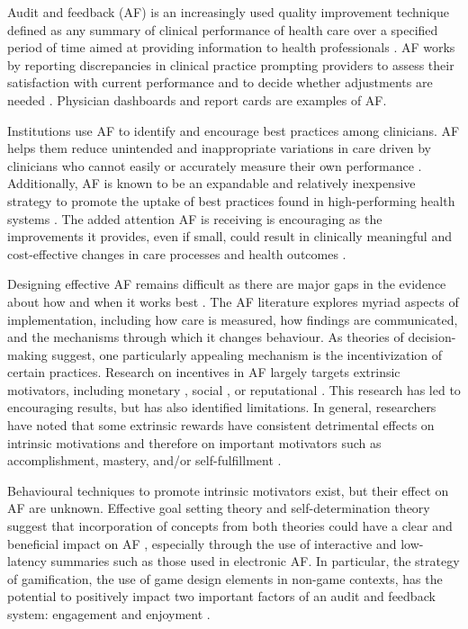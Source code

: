 Audit and feedback (\gls{AF}) is an increasingly used quality improvement technique defined as any summary of clinical performance of health care over a specified period of time aimed at providing information to health professionals \cite{flottorp2010using}. \gls{AF} works by reporting discrepancies in clinical practice prompting providers to assess their satisfaction with current performance and to decide whether adjustments are needed \cite{gould2014application}. Physician dashboards and report cards are examples of \gls{AF}.

Institutions use \gls{AF} to identify and encourage best practices among clinicians. \gls{AF} helps them reduce unintended and inappropriate variations in care driven by clinicians who cannot easily or accurately measure their own performance \cite{davis2006accuracy}. Additionally, \gls{AF} is known to be an expandable and relatively inexpensive strategy to promote the uptake of best practices found in high-performing health systems \cite{baker2015creating}. The added attention \gls{AF} is receiving is encouraging as the improvements it provides, even if small, could result in clinically meaningful and cost-effective changes in care processes and health outcomes \cite{ivers2018using}.

Designing effective \gls{AF} remains difficult as there are major gaps in the evidence about how and when it works best \cite{foy2005we}. The \gls{AF} literature explores myriad aspects of implementation, including how care is measured, how findings are communicated, and the mechanisms through which it changes behaviour. As theories of decision-making suggest, one particularly appealing mechanism is the incentivization of certain practices. Research on incentives in \gls{AF} largely targets extrinsic motivators, including monetary \cite{campbell2007payperf}, social \cite{ehrenfeld2014automated}, or reputational \cite{schneider1998use}.  This research has led to encouraging results, but has also identified limitations. In general, researchers have noted that some extrinsic rewards have consistent detrimental effects on intrinsic motivations and therefore on important motivators such as accomplishment, mastery, and/or self-fulfillment \cite{deci1999meta}.

Behavioural techniques to promote intrinsic motivators exist, but their effect on \gls{AF} are unknown. Effective goal setting theory and self-determination theory suggest that incorporation of concepts from both theories could have a clear and beneficial impact on \gls{AF} \cite{locke2002building}, especially through the use of interactive and low-latency summaries such as those used in electronic \gls{AF}. In particular, the strategy of gamification, the use of game design elements in non-game contexts, has the potential to positively impact two important factors of an audit and feedback system: engagement and enjoyment \cite{hamari2014does}.

